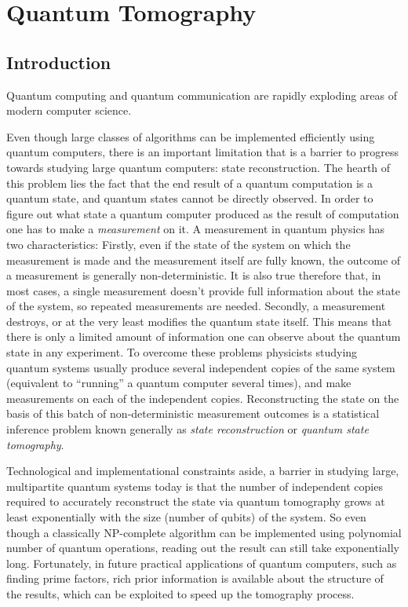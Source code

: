 \chapter{Quantum Tomography}

\section{Introduction}

Quantum computing and quantum communication are rapidly exploding areas of modern computer science.

Even though large classes of algorithms can be implemented efficiently using quantum computers, there is an important limitation that is a barrier to progress towards studying large quantum computers: state reconstruction. The hearth of this problem lies the fact that the end result of a quantum computation is a quantum state, and quantum states cannot be directly observed. In order to figure out what state a quantum computer produced as the result of computation one has to make a \emph{measurement} on it. A measurement in quantum physics has two characteristics: Firstly, even if the state of the system on which the measurement is made and the measurement itself are fully known, the outcome of a measurement is generally non-deterministic. It is also true therefore that, in most cases, a single measurement doesn't provide full information about the state of the system, so repeated measurements are needed. Secondly, a measurement destroys, or at the very least modifies the quantum state itself. This means that there is only a limited amount of information one can observe about the quantum state in any experiment. To overcome these problems physicists studying quantum systems usually produce several independent copies of the same system (equivalent to ``running'' a quantum computer several times), and make measurements on each of the independent copies. Reconstructing the state on the basis of this batch of non-deterministic measurement outcomes is a statistical inference problem known generally as \emph{state reconstruction} or \emph{quantum state tomography}.

Technological and implementational constraints aside, a barrier in studying large, multipartite quantum systems today is that the number of independent copies required to accurately reconstruct the state via quantum tomography grows at least exponentially with the size (number of qubits) of the system. So even though a classically NP-complete algorithm can be implemented using polynomial number of quantum operations, reading out the result can still take exponentially long. Fortunately, in future practical applications of quantum computers, such as finding prime factors, rich prior information is available about the structure of the results, which can be exploited to speed up the tomography process.

